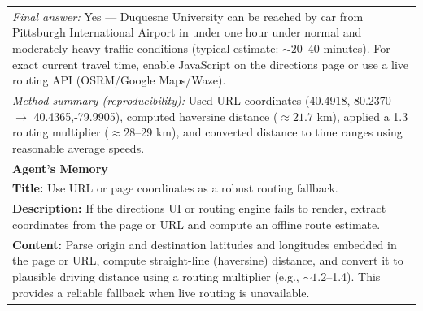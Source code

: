 \documentclass{article}
\begin{document}
\begin{table}[h]
\begin{tabularx}{\textwidth}{>{\raggedright\arraybackslash}X}
\colorbox{green!20}{\textit{Final answer:} Yes}
 --- Duquesne University can be reached by car from Pittsburgh International Airport in under one hour under normal and moderately heavy traffic conditions (typical estimate: \(\sim 20\)--40 minutes). For exact current travel time, enable JavaScript on the directions page or use a live routing API (OSRM/Google Maps/Waze).\\
\textit{Method summary (reproducibility):} Used URL coordinates (40.4918,-80.2370 \(\rightarrow\) 40.4365,-79.9905), computed haversine distance (\(\approx 21.7\) km), applied a 1.3 routing multiplier (\(\approx 28\)--29 km), and converted distance to time ranges using reasonable average speeds.
\\\midrule
\rowcolor{gray!10}
\textbf{Agent's Memory} \\
\midrule
\textbf{Title:} Use URL or page coordinates as a robust routing fallback.\\
\textbf{Description:} If the directions UI or routing engine fails to render, extract coordinates from the page or URL and compute an offline route estimate.\\
\textbf{Content:} Parse origin and destination latitudes and longitudes embedded in the page or URL, compute straight-line (haversine) distance, and convert it to plausible driving distance using a routing multiplier (e.g., \(\sim 1.2\)--1.4). This provides a reliable fallback when live routing is unavailable. \\
\bottomrule
\end{tabularx}
\end{table}

\newpage



\clearpage

\end{document}
